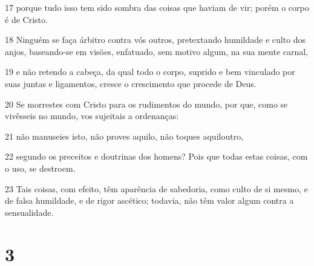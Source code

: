 \par 17 porque tudo isso tem sido sombra das coisas que haviam de vir; porém o corpo é de Cristo.
\par 18 Ninguém se faça árbitro contra vós outros, pretextando humildade e culto dos anjos, baseando-se em visões, enfatuado, sem motivo algum, na sua mente carnal,
\par 19 e não retendo a cabeça, da qual todo o corpo, suprido e bem vinculado por suas juntas e ligamentos, cresce o crescimento que procede de Deus.
\par 20 Se morrestes com Cristo para os rudimentos do mundo, por que, como se vivêsseis no mundo, vos sujeitais a ordenanças:
\par 21 não manuseies isto, não proves aquilo, não toques aquiloutro,
\par 22 segundo os preceitos e doutrinas dos homens? Pois que todas estas coisas, com o uso, se destroem.
\par 23 Tais coisas, com efeito, têm aparência de sabedoria, como culto de si mesmo, e de falsa humildade, e de rigor ascético; todavia, não têm valor algum contra a sensualidade.

\chapter{3}

